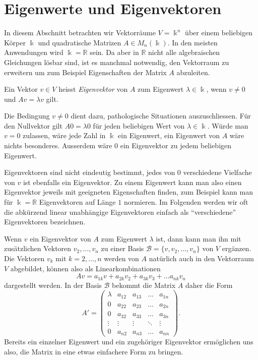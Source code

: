 %
%
%
\section{Eigenwerte und Eigenvektoren
\label{buch:section:eigenwerte-und-eigenvektoren}}
In diesem Abschnitt betrachten wir Vektorräume $V=\Bbbk^n$ über einem
beliebigen Körper $\Bbbk$ und quadratische Matrizen
$A\in M_n(\Bbbk)$.
In den meisten Anwendungen wird $\Bbbk=\mathbb{R}$ sein.
Da aber in $\mathbb{R}$ nicht alle algebraischen Gleichungen lösbar sind,
ist es manchmal notwendig, den Vektorraum zu erweitern um zum Beispiel
Eigenschaften der Matrix $A$ abzuleiten.

\begin{definition}
Ein Vektor $v\in V$ heisst {\em Eigenvektor} von $A$ zum Eigenwert
$\lambda\in\Bbbk$, wenn $v\ne 0$ und $Av=\lambda v$ gilt.
\end{definition}

Die Bedingung $v\ne 0$ dient dazu, pathologische Situationen auszuschliessen.
Für den Nullvektor gilt $A0=\lambda 0$ für jeden beliebigen Wert von
$\lambda\in\Bbbk$.
Würde man $v=0$ zulassen, wäre jede Zahl in $\Bbbk$ ein Eigenwert,
ein Eigenwert von $A$ wäre nichts besonderes.
Ausserdem wäre $0$ ein Eigenvektor zu jedem beliebigen Eigenwert.

Eigenvektoren sind nicht eindeutig bestimmt, jedes von $0$ verschiedene
Vielfache von $v$ ist ebenfalls ein Eigenvektor.
Zu einem Eigenwert kann man also einen Eigenvektor jeweils mit 
geeigneten Eigenschaften finden, zum Beispiel kann man für $\Bbbk = \mathbb{R}$
Eigenvektoren auf Länge $1$ normieren.
Im Folgenden werden wir oft die abkürzend linear unabhängige Eigenvektoren
einfach als ``verschiedene'' Eigenvektoren bezeichnen.

Wenn $v$ ein Eigenvektor von $A$ zum Eigenwert $\lambda$ ist, dann kann
man ihn mit zusätzlichen Vektoren $v_2,\dots,v_n$ zu einer Basis
$\mathcal{B}=\{v,v_2,\dots,v_n\}$
von $V$ ergänzen.
Die Vektoren $v_k$ mit $k=2,\dots,n$ werden von $A$ natürlich auch
in den Vektorraum $V$ abgebildet, können also als Linearkombinationen
\[
Av = a_{1k}v + a_{2k}v_2 + a_{3k}v_3 + \dots a_{nk}v_n
\]
dargestellt werden.
In der Basis $\mathcal{B}$ bekommt die Matrix $A$ daher die Form
\[
A'
=
\begin{pmatrix}
\lambda&a_{12}&a_{13}&\dots &a_{1n}\\
    0  &a_{22}&a_{23}&\dots &a_{2n}\\
    0  &a_{32}&a_{33}&\dots &a_{3n}\\
\vdots &\vdots&\vdots&\ddots&\vdots\\
    0  &a_{n2}&a_{n3}&\dots &a_{nn}
\end{pmatrix}.
\]
Bereits ein einzelner Eigenwert und ein zugehöriger Eigenvektor
ermöglichen uns also, die Matrix in eine etwas einfachere Form
zu bringen.

